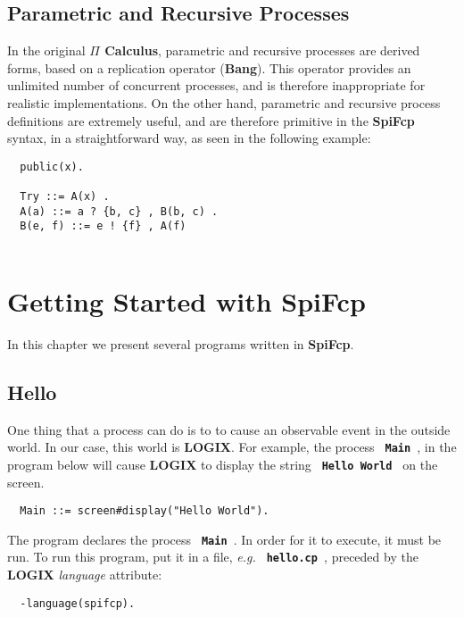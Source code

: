 \documentclass[twoside,10pt]{report}
\begin{document}
\section{Parametric and Recursive Processes}

In the original {\bf $\Pi$ Calculus}, parametric and recursive processes are
derived forms, based on a replication operator ({\bf Bang}).  This operator
provides an unlimited number of concurrent processes, and is therefore
inappropriate for realistic implementations. On the other hand,
parametric and recursive process definitions are extremely useful, and
are therefore primitive in the {\bf SpiFcp} syntax, in a straightforward way,
as seen in the following example:

\begin{verbatim}
  public(x).

  Try ::= A(x) .
  A(a) ::= a ? {b, c} , B(b, c) .
  B(e, f) ::= e ! {f} , A(f) 
 
\end{verbatim}


\chapter{Getting Started with SpiFcp}
\label{simple programs}

In this chapter we present several programs written in {\bf SpiFcp}.

\section{Hello}

One thing that a process can do is to to cause an observable
event in the outside world. In our case, this world is {\bf LOGIX}.
For example, the process {\bf \verb+ Main +}, in the program below will cause
{\bf LOGIX} to display the string {\bf \verb+ Hello World +} on the screen.

\begin{verbatim}
  Main ::= screen#display("Hello World").
\end{verbatim}

\noindent

The program declares the process {\bf \verb+ Main +}. In order for it to
execute, it must be run.  To run this program, put it in a file,
{\em e.g.} {\bf \verb+ hello.cp +}, preceded by the {\bf LOGIX}
{\em language} attribute:

\begin{verbatim}
  -language(spifcp).
\end{verbatim}
\end{document}
